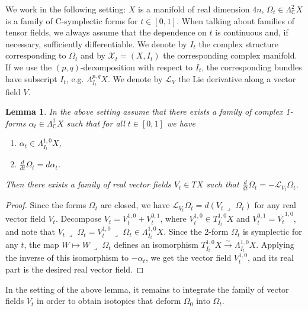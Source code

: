 \documentclass[10pt]{amsart}
\newcommand{\bbC}{\mathbb{C}}
\newcommand{\LL}{\mathcal{L}}
\newcommand{\XX}{\mathcal{X}}
\newcommand{\cnv}{\,\lrcorner\,\,}
\newtheorem{lem}[defn]{Lemma}
\begin{document}
We work in the following setting: $X$ is a manifold of real dimension $4n$,
$\Omega_t \in \Lambda^2_{\bbC}X$ is a family of C-symplectic forms
for $t\in [0,1]$. When talking about families of tensor fields, we always
assume that the dependence on $t$ is continuous and, if necessary, sufficiently differentiable.
We denote by $I_t$ the complex structure corresponding to $\Omega_t$
and by $\XX_t = (X,I_t)$ the corresponding complex manifold. If we use the $(p,q)$-decomposition
with respect to $I_t$, the corresponding bundles have subscript $I_t$, e.g. $\Lambda^{p,q}_{I_t}X$.
We denote by $\LL_{V}$ the Lie derivative along a vector field $V$.

\begin{lem}\label{lem_v}
In the above setting assume that there exists a family of complex 1-forms
$\alpha_t\in \Lambda^1_{\bbC} X$ such that for all $t\in [0,1]$ we have
\begin{enumerate}
\item $\alpha_t\in \Lambda^{1,0}_{I_t}X$,
\item $\frac{d}{dt}{\Omega}_t = d\alpha_t$.
\end{enumerate}
Then there exists a family of real vector fields $V_t\in TX$ such
that $\frac{d}{dt}{\Omega}_t = -\LL_{V_t}\Omega_t$.
\end{lem}
\begin{proof}
Since the forms $\Omega_t$ are closed, we have $\LL_{V_t}\Omega_t = d(V_t\cnv\Omega_t)$
for any real vector field $V_t$. Decompose $V_t = V_t^{1,0} + V_t^{0,1}$, where $V_t^{1,0} \in T^{1,0}_{I_t}X$
and $V_t^{0,1} = \overline{V_t}^{1,0}$, and note that 
$V_t\cnv\Omega_t = V^{1,0}_t\cnv\Omega_t\in \Lambda^{1,0}_{I_t}X$.
Since the 2-form $\Omega_t$ is symplectic for any $t$,
the map $W\mapsto W\cnv\Omega_t$ defines an isomorphism $T^{1,0}_{I_t}X \stackrel{\sim}{\to}\Lambda^{1,0}_{I_t}X$.
Applying the inverse of this isomorphism to $-\alpha_t$, we get the vector field $V_t^{1,0}$,
and its real part is the desired real vector field.
\end{proof}

In the setting of the above lemma, it remains to integrate the family
of vector fields $V_t$ in order to obtain isotopies that deform $\Omega_0$ into $\Omega_t$.
\end{document}
